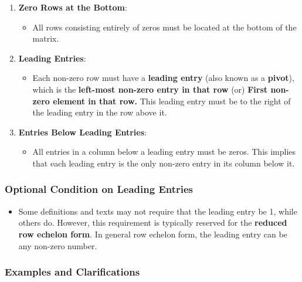 \documentclass[11pt]{article}
\providecommand{\tightlist}{%
      \setlength{\itemsep}{0pt}\setlength{\parskip}{0pt}}
\begin{document}
\begin{enumerate}
\def\labelenumi{\arabic{enumi}.}
\tightlist
\item
  \textbf{Zero Rows at the Bottom}:

  \begin{itemize}
  \tightlist
  \item
    All rows consisting entirely of zeros must be located at the bottom
    of the matrix.
  \end{itemize}
\item
  \textbf{Leading Entries}:

  \begin{itemize}
  \tightlist
  \item
    Each non-zero row must have a \textbf{leading entry} (also known as
    a \textbf{pivot}), which is the \textbf{left-most non-zero entry in
    that row} (or) \textbf{First non-zero element in that row.} This
    leading entry must be to the right of the leading entry in the row
    above it.
  \end{itemize}
\item
  \textbf{Entries Below Leading Entries}:

  \begin{itemize}
  \tightlist
  \item
    All entries in a column below a leading entry must be zeros. This
    implies that each leading entry is the only non-zero entry in its
    column below it.
  \end{itemize}
\end{enumerate}

\hypertarget{optional-condition-on-leading-entries}{%
\subsubsection{Optional Condition on Leading
Entries}\label{optional-condition-on-leading-entries}}

\begin{itemize}
\tightlist
\item
  Some definitions and texts may not require that the leading entry be
  1, while others do. However, this requirement is typically reserved
  for the \textbf{reduced row echelon form}. In general row echelon
  form, the leading entry can be any non-zero number.
\end{itemize}

\hypertarget{examples-and-clarifications}{%
\subsubsection{Examples and
Clarifications}\label{examples-and-clarifications}}
\end{document}
